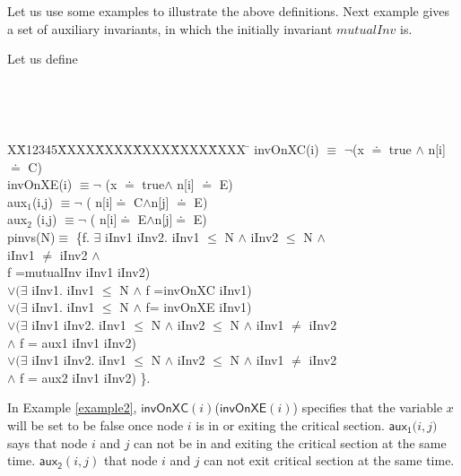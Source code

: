 \documentclass[final]{IEEEtran}
\newlength{\fminilength}
\newenvironment{fmini}[1][\linewidth]
  {\setlength{\fminilength}{#1\fboxsep-2\fboxrule}%
   \vspace{2ex}\noindent\begin{lrbox}{\fminibox}\begin{minipage}{\fminilength}%
   \mbox{ }\hfill\vspace{-2.5ex}}%
  {\end{minipage}\end{lrbox}\vspace{1ex}\hspace{0ex}%
   \framebox{\usebox{\fminibox}}}
\newenvironment{specification}
{\noindent\scriptsize
\tt\begin{fmini}\begin{tabbing}X\=X12345\=XXXX\=XXXX\=XXXX\=XXXX\=XXXX
\=\+\kill} {\end{tabbing}\normalfont\end{fmini}}
\def \andc {\wedge }
\def \negc {\lnot}
\def \iInv {iInv}
\begin{document}
{%


Let us use some examples to illustrate the above definitions. Next example gives a set of auxiliary invariants, in which the initially invariant $mutualInv$ is.

\begin{example}\label{example2}
Let us define

\begin{specification}
invOnXC(i)  $\equiv$ $\negc$(x $\doteq$ true $\andc$ n[i]$\doteq$ C)   \\

invOnXE(i)   $\equiv \negc$ (x $\doteq$ true$\andc$ n[i] $\doteq$ E)  \\


aux$_1$(i,j)   $\equiv \negc$ ( n[i]$\doteq$ C$\andc$n[j] $\doteq$ E)  \\

aux$_2$ (i,j) $\equiv \negc$  ( n[i]$\doteq$ E$\andc$n[j]$\doteq$ E)\\

  pinvs(N)$\equiv$ \{f. $\exists$ \iInv1 \iInv2. \iInv1 $\le$ N $\wedge$ \iInv2 $\le$ N $\wedge$\\
   \iInv1 $\ne$ \iInv2 $\wedge$   \\
   f =mutualInv   \iInv1 \iInv2) \\
 $ \vee(\exists$ \iInv1. \iInv1 $\le$ N $\wedge$  f =invOnXC  \iInv1)   \\
$\vee(\exists$ \iInv1. \iInv1 $\le$ N $\wedge$  f= invOnXE \iInv1)    \\
$\vee(\exists$ \iInv1 \iInv2. \iInv1 $\le$ N $\wedge$ \iInv2 $\le$ N $\wedge$ \iInv1 $\ne$ \iInv2 \\
$\wedge$ f =  aux1  \iInv1 \iInv2) \\
$\vee(\exists$ \iInv1 \iInv2. \iInv1 $\le$ N $\wedge$ \iInv2 $\le$ N $\wedge$ \iInv1 $\ne$ \iInv2 \\
$\wedge$ f =  aux2  \iInv1 \iInv2) \}.

\end{specification}
\end{example}
In Example \ref{example2}, $\mathsf{invOnXC}(i)$($\mathsf{invOnXE}(i)$) specifies that the variable $x$ will be set to be false once node $i$ is in or exiting the critical section. $\mathsf{aux_1(}i,j)$ says that node $i$ and $j$ can not be in and exiting the critical section at the same time. $\mathsf{aux_2}(i,j)$  that node $i$ and $j$ can not exit critical section at the same time.

}
\end{document}
